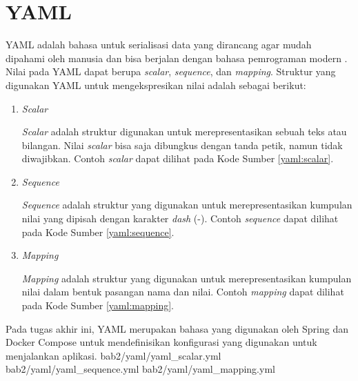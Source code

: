 \section{YAML}
\par YAML adalah bahasa untuk serialisasi data yang dirancang agar mudah dipahami oleh manusia dan bisa berjalan dengan bahasa pemrograman modern \cite{yaml-online}. Nilai pada YAML dapat berupa \textit{scalar}, \textit{sequence}, dan \textit{mapping}. Struktur yang digunakan YAML untuk mengekspresikan nilai adalah sebagai berikut:
\begin{enumerate}[listparindent=2.5em]
	\item \textit{Scalar}
	\par \textit{Scalar} adalah struktur digunakan untuk merepresentasikan sebuah teks atau bilangan. Nilai \textit{scalar} bisa saja dibungkus dengan tanda petik, namun tidak diwajibkan. Contoh \textit{scalar} dapat dilihat pada Kode Sumber \ref{yaml:scalar}.
	\item \textit{Sequence}
	\par \textit{Sequence} adalah struktur yang digunakan untuk merepresentasikan kumpulan nilai yang dipisah dengan karakter \textit{dash} (-). Contoh \textit{sequence} dapat dilihat pada Kode Sumber \ref{yaml:sequence}.
	\item \textit{Mapping}
	\par \textit{Mapping} adalah struktur yang digunakan untuk merepresentasikan kumpulan nilai dalam bentuk pasangan nama dan nilai. Contoh \textit{mapping} dapat dilihat pada Kode Sumber \ref{yaml:mapping}.
\end{enumerate}
\par Pada tugas akhir ini, YAML merupakan bahasa yang digunakan oleh Spring dan Docker Compose untuk mendefinisikan konfigurasi yang digunakan untuk menjalankan aplikasi.
 {bab2/yaml/yaml_scalar.yml}
 {bab2/yaml/yaml_sequence.yml}
 {bab2/yaml/yaml_mapping.yml}
